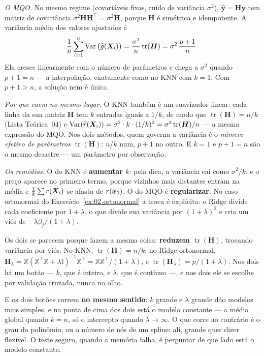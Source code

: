 \begin{solucao}
\emph{O MQO.} No mesmo regime (covariáveis fixas, ruído de variância $\sigma^2$),
$\widehat{\bm y}=\bm H\bm y$ tem matriz de covariância $\sigma^2\bm H\bm H^\top=\sigma^2\bm H$,
porque $\bm H$ é simétrica e idempotente. A variância média dos valores ajustados é
\[
  \frac1n\sum_{i=1}^n\operatorname{Var}\big(\widehat g(\bm{X}_i)\big)
  =\frac{\sigma^2}{n}\operatorname{tr}(\bm H)=\sigma^2\,\frac{p+1}{n}.
\]
Ela cresce linearmente com o número de parâmetros e chega a $\sigma^2$ quando
$p+1=n$ --- a interpolação, exatamente como no KNN com $k=1$. Com $p+1>n$, a solução
nem é única.

\emph{Por que caem no mesmo lugar.} O KNN também é um suavizador linear: cada linha da
sua matriz $\bm H$ tem $k$ entradas iguais a $1/k$, de modo que
$\operatorname{tr}(\bm H)=n/k$ (Lista Teórica~04) e
$\operatorname{Var}(\widehat{r}(\bm{X}_i))=\sigma^2\cdot k\cdot(1/k)^2=\sigma^2\operatorname{tr}(\bm H)/n$ --- a
mesma expressão do MQO. Nos dois métodos, quem governa a variância é o \emph{número
efetivo de parâmetros} $\operatorname{tr}(\bm H)$: $n/k$ num, $p+1$ no outro. E $k=1$ e
$p+1=n$ são o mesmo desastre --- um parâmetro por observação.

\emph{Os remédios.} O do KNN é \textbf{aumentar $k$}: pela dica, a variância cai como
$\sigma^2/k$, e o preço aparece no primeiro termo, porque vizinhos mais distantes
entram na média e $\frac1k\sum r(\bm{X}_i)$ se afasta de $r(\bm{x}_0)$. O do MQO é
\textbf{regularizar}. No caso ortonormal do Exercício~\ref{ex:02-ortonormal} a troca é
explícita: o Ridge divide cada coeficiente por $1+\lambda$, o que divide sua variância
por $(1+\lambda)^2$ e cria um viés de $-\lambda\beta_j/(1+\lambda)$.

Os dois se parecem porque fazem a mesma coisa: \textbf{reduzem $\operatorname{tr}(\bm H)$},
trocando variância por viés. No KNN, $\operatorname{tr}(\bm H)=n/k$; no Ridge
ortonormal, $\bm H_\lambda=\mathbb{X}(\mathbb{X}^\top\mathbb{X}+\lambda\mathbb{I})^{-1}\mathbb{X}^\top=\mathbb{X}\mathbb{X}^\top/(1+\lambda)$,
e $\operatorname{tr}(\bm H_\lambda)=p/(1+\lambda)$. Nos dois há um botão --- $k$, que é
inteiro, e $\lambda$, que é contínuo ---, e nos dois ele se escolhe por validação
cruzada, nunca no olho.

E os dois botões correm \textbf{no mesmo sentido}: $k$ grande e $\lambda$ grande dão
modelos mais simples, e na ponta de cima dos dois está o modelo constante --- a média
global quando $k=n$, só o intercepto quando $\lambda\to\infty$. O que corre ao contrário
é o grau do polinômio, ou o número de nós de um spline: ali, grande quer dizer
flexível. O teste seguro, quando a memória falha, é perguntar de que lado está o modelo
constante.


\end{solucao}
